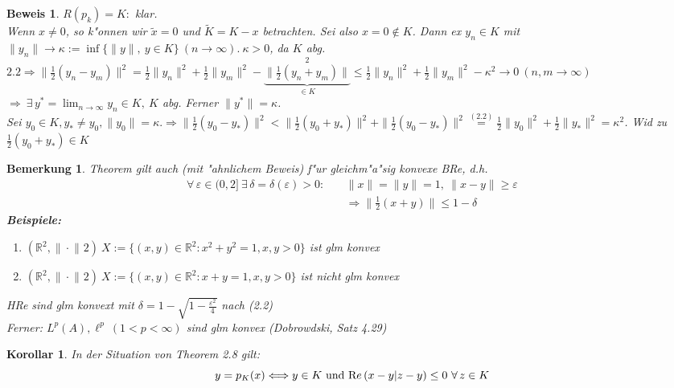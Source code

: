 \documentclass[a4paper,11pt]{book}
\newcommand{\R}{{\mathbb R}}
\newcommand{\eps}{{\varepsilon}}
\newcommand{\re}{\ensuremath{\text Re}\,} %
\newcommand{\LN}[1][]{\| \cdot \|_{#1}} %
\newtheorem{Kor}[Def]{Korollar}
\newtheorem*{BemNO}{Bemerkung}
\theoremstyle{nonumberplain}
\newtheorem{Bew}{Beweis}
\begin{document}
\begin{Bew}
$R(p_k) = K:$ klar.\\
Wenn $x \not= 0$, so k"onnen wir $\tilde{x} = 0$ und $\tilde{K} = K-x$ betrachten. Sei also $x=0 \not\in K$. Dann ex $y_n \in K$ mit $\|y_n\| \rightarrow \kappa := \inf \{\|y\|,\ y \in K\} \ (n \rightarrow \infty).\ \kappa > 0$, da $K$ abg. $2.2 \Rightarrow \| \frac12 (y_n-y_m)\|^2 = \frac12 \|y_n\|^2 + \frac12 \|y_m\|^2 - \underbrace{\|\frac12(y_n+y_m)\|}_{\in K}^2 \leq \frac12 \|y_n\|^2 + \frac12 \|y_m\|^2 - \kappa^2 \rightarrow 0 \ (n,m \rightarrow \infty)$\\
$\Rightarrow \ \exists\, y^{\ast} = \lim_{n \rightarrow \infty} y_n \in K,\ K$ abg. Ferner $\|y^{\ast}\| = \kappa$.\\
Sei $y_0 \in K, y_{\ast} \not= y_0, \|y_0\| = \kappa. \Rightarrow \|\frac12 (y_0 - y_{\ast})\|^2 < \| \frac12 (y_0 + y_{\ast})\|^2 + \|\frac12 (y_0 - y_{\ast})\|^2 \stackrel{(2.2)}{=} \frac12 \|y_0\|^2 + \frac12 \|y_{\ast}\|^2 = \kappa^2$. Wid zu $\frac12(y_0 + y_{\ast}) \in K$
\end{Bew}


\begin{BemNO}
Theorem gilt auch (mit "ahnlichem Beweis) f"ur gleichm"a"sig konvexe BRe, d.h.
\begin{eqnarray*}
\forall\, \eps \in (0,2] \ \exists\, \delta = \delta(\eps) > 0:& \ & \|x\| = \|y\| = 1,\ \|x-y\| \geq \eps\\
& & \Longrightarrow \|\frac12(x+y)\| \leq 1 - \delta
\end{eqnarray*}
\textbf{Beispiele:} \\
\begin{enumerate}
\item $(\R^2,\LN{2})\ X := \{(x,y) \in \R^2: x^2+y^2 = 1, x,y > 0\}$ ist glm konvex

\item $(\R^2,\LN{2})\ X := \{(x,y) \in \R^2: x+y = 1, x,y > 0\}$ ist nicht glm konvex
\end{enumerate}
HRe sind glm konvext mit $\delta = 1 - \sqrt{1-\frac{\eps^2}4}$ nach (2.2)\\
Ferner: $L^p(A), \ell^p \ (1<p<\infty)$ sind glm konvex (Dobrowdski, Satz 4.29)
\end{BemNO}

\begin{Kor}
In der Situation von Theorem 2.8 gilt:
\[
y = p_K(x) \Longleftrightarrow y \in K \text{ und } \re(x-y|z-y) \leq 0 \ \forall\, z \in K
\]
\end{Kor}
\end{document}
